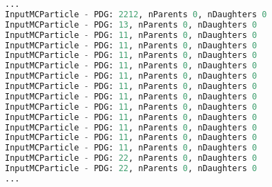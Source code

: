 \begin{lstlisting}[language=Basic, caption=Output of the programm]
...
InputMCParticle - PDG: 2212, nParents 0, nDaughters 0
InputMCParticle - PDG: 13, nParents 0, nDaughters 0
InputMCParticle - PDG: 11, nParents 0, nDaughters 0
InputMCParticle - PDG: 11, nParents 0, nDaughters 0
InputMCParticle - PDG: 11, nParents 0, nDaughters 0
InputMCParticle - PDG: 11, nParents 0, nDaughters 0
InputMCParticle - PDG: 11, nParents 0, nDaughters 0
InputMCParticle - PDG: 11, nParents 0, nDaughters 0
InputMCParticle - PDG: 11, nParents 0, nDaughters 0
InputMCParticle - PDG: 11, nParents 0, nDaughters 0
InputMCParticle - PDG: 11, nParents 0, nDaughters 0
InputMCParticle - PDG: 11, nParents 0, nDaughters 0
InputMCParticle - PDG: 11, nParents 0, nDaughters 0
InputMCParticle - PDG: 11, nParents 0, nDaughters 0
InputMCParticle - PDG: 22, nParents 0, nDaughters 0
InputMCParticle - PDG: 22, nParents 0, nDaughters 0
...
\end{lstlisting}

